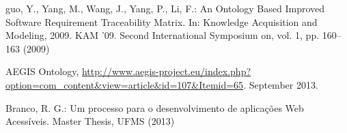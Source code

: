\documentclass[runningheads,a4paper]{llncs}
\begin{document}
\begin{thebibliography}{4}
 guo, Y., Yang, M., Wang, J., Yang, P., Li, F.: An Ontology Based Improved
Software Requirement Traceability Matrix. In: Knowledge Acquisition and
Modeling, 2009. KAM '09. Second International Symposium on, vol. 1, pp.
160--163 (2009)

 AEGIS Ontology, \url{http://www.aegis-project.eu/index.php?option=com_content&view=article&id=107&Itemid=65}. September 2013.

 Branco, R. G.: Um processo para o desenvolvimento de aplicações Web Acessíveis.
Master Thesis, UFMS (2013)

\end{thebibliography}
\end{document}
